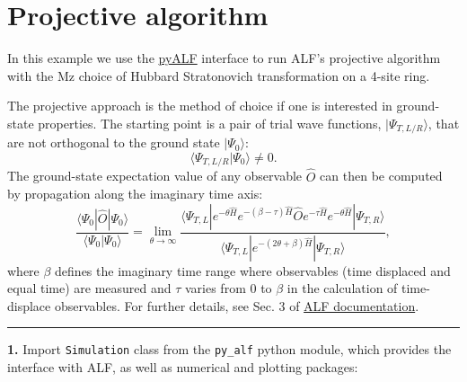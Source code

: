     
    

    
    \hypertarget{projective-algorithm}{%
\section{Projective algorithm}\label{projective-algorithm}}

    In this example we use the
\href{https://git.physik.uni-wuerzburg.de/ALF/pyALF/-/tree/master/}{pyALF}
interface to run ALF's projective algorithm with the Mz choice of
Hubbard Stratonovich transformation on a 4-site ring.

The projective approach is the method of choice if one is interested in
ground-state properties. The starting point is a pair of trial wave
functions, \(|\Psi_{T,L/R} \rangle\), that are not orthogonal to the
ground state \(|\Psi_0 \rangle\): \[
  \langle \Psi_{T,L/R}  | \Psi_0 \rangle  \neq 0. 
\] The ground-state expectation value of any observable \(\hat{O}\) can
then be computed by propagation along the imaginary time axis: \[
     \frac{ \langle \Psi_0 | \hat{O} | \Psi_0 \rangle }{ \langle \Psi_0 | \Psi_0 \rangle}   = \lim_{\theta \rightarrow \infty}  
     \frac{ \langle \Psi_{T,L} | e^{-\theta \hat{H}}  e^{-(\beta - \tau)\hat{H}  }\hat{O} e^{- \tau  \hat{H} }   e^{-\theta \hat{H}} | \Psi_{T,R} \rangle } 
            { \langle \Psi_{T,L} | e^{-(2 \theta + \beta) \hat{H}  } | \Psi_{T,R} \rangle } ,
\] where \(\beta\) defines the imaginary time range where observables
(time displaced and equal time) are measured and \(\tau\) varies from
\(0\) to \(\beta\) in the calculation of time-displace observables. For
further details, see Sec. 3 of
\href{https://git.physik.uni-wuerzburg.de/ALF/ALF/-/blob/master/Documentation/doc.pdf}{ALF
documentation}.

\begin{center}\rule{0.5\linewidth}{0.5pt}\end{center}

\textbf{1.} Import \texttt{Simulation} class from the \texttt{py\_alf}
python module, which provides the interface with ALF, as well as
numerical and plotting packages:

